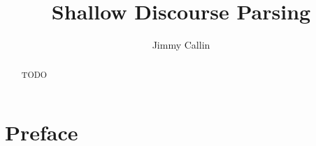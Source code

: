 \documentclass[master,times]{stpthesis}
\begin{document}
\author{Jimmy Callin}
\title{Shallow Discourse Parsing}

\maketitle
\frontmatter*

\begin{abstract}
  TODO
\end{abstract}

\clearpage
\tableofcontents*

\chapter{Preface}

\mainmatter*






% 
\end{document}
